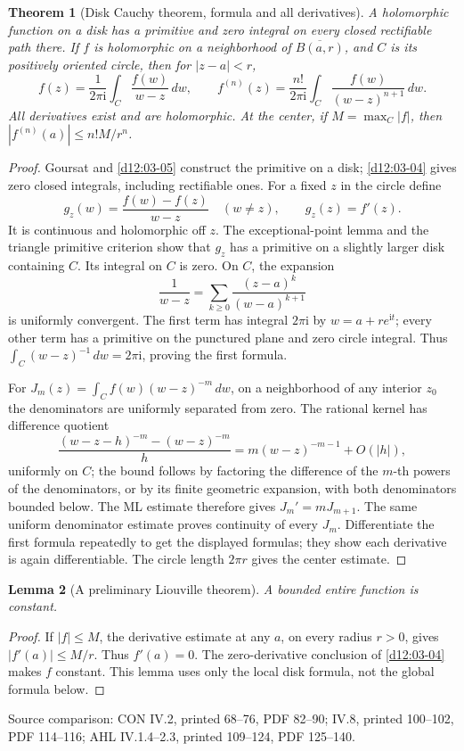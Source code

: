 \documentclass[11pt,a4paper,openany]{book}
\newtheorem{theorem}{Theorem}[chapter]
\newtheorem{lemma}[theorem]{Lemma}
\theoremstyle{definition}
\theoremstyle{remark}\newtheorem{remark}[theorem]{Remark}
\newcommand{\dd}{\,d}\newcommand{\iu}{\mathrm i}
\newcommand{\family}[1]{}
\newcommand{\source}[1]{\par\begingroup\small\sffamily\color{black!65}Source comparison: #1\par\endgroup}
\begin{document}
\begin{theorem}[Disk Cauchy theorem, formula and all derivatives]\family{D12.04.02}\label{d12:04-02}
A holomorphic function on a disk has a primitive and zero integral on every
closed rectifiable path there. If \(f\) is holomorphic on a neighborhood
of \(\overline{B(a,r)}\), and \(C\) is its positively oriented circle, then
for \(|z-a|<r\),
\[
 f(z)=\frac1{2\pi\iu}\int_C\frac{f(w)}{w-z}\dd w,\qquad
 f^{(n)}(z)=\frac{n!}{2\pi\iu}
               \int_C\frac{f(w)}{(w-z)^{n+1}}\dd w .
\]
All derivatives exist and are holomorphic. At the center, if
\(M=\max_C|f|\), then \(|f^{(n)}(a)|\le n!M/r^n\).
\end{theorem}
\begin{proof}
Goursat and \cref{d12:03-05} construct the primitive on a disk;
\cref{d12:03-04} gives zero closed integrals, including rectifiable ones.
For a fixed \(z\) in the circle define
\[
 g_z(w)=\frac{f(w)-f(z)}{w-z}\quad(w\ne z),\qquad g_z(z)=f'(z).
\]
It is continuous and holomorphic off \(z\).
The exceptional-point lemma and the triangle primitive criterion show
that \(g_z\) has a primitive on a slightly larger disk containing \(C\).
Its integral on \(C\) is zero. On \(C\), the expansion
\[
 \frac1{w-z}=\sum_{k\ge0}\frac{(z-a)^k}{(w-a)^{k+1}}
\]
is uniformly convergent. The first term has integral \(2\pi\iu\) by
\(w=a+re^{\iu t}\); every other term has a primitive on the punctured
plane and zero circle integral. Thus
\(\int_C(w-z)^{-1}\dd w=2\pi\iu\), proving the first formula.

For \(J_m(z)=\int_C f(w)(w-z)^{-m}\dd w\), on a neighborhood of any
interior \(z_0\) the denominators are uniformly separated from zero.
The rational kernel has difference quotient
\[
 \frac{(w-z-h)^{-m}-(w-z)^{-m}}h
   =m(w-z)^{-m-1}+O(|h|),
\]
uniformly on \(C\); the bound follows by factoring the difference of
the \(m\)-th powers of the denominators, or by its finite geometric
expansion, with both denominators bounded below.
The ML estimate therefore gives \(J_m'=mJ_{m+1}\).
The same uniform denominator estimate proves continuity of every \(J_m\).
Differentiate the first formula repeatedly to get the displayed formulas;
they show each derivative is again differentiable. The circle length
\(2\pi r\) gives the center estimate.
\end{proof}

\begin{lemma}[A preliminary Liouville theorem]\label{d12:04:liouville}
A bounded entire function is constant.
\end{lemma}
\begin{proof}
If \(|f|\le M\), the derivative estimate at any \(a\), on every radius
\(r>0\), gives \(|f'(a)|\le M/r\). Thus \(f'(a)=0\). The zero-derivative
conclusion of \cref{d12:03-04} makes \(f\) constant.
This lemma uses only the local disk formula, not the global formula below.
\end{proof}
\source{CON IV.2, printed 68--76, PDF 82--90; IV.8, printed 100--102, PDF 114--116; AHL IV.1.4--2.3, printed 109--124, PDF 125--140.}
\end{document}
